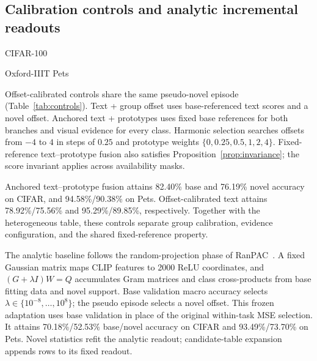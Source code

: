 \documentclass[research]{fcs}
\begin{document}
\subsection{Calibration controls and analytic incremental readouts}
\begin{table}[t]
\centering
\caption{Additional five-shot controls with the same frozen encoder, support images, and base-only calibration. Values are mean $\pm$ sample standard deviation across three partitions. The random-projection readout is a controlled frozen RanPAC-style adaptation described in the text.}
\label{tab:controls}
\small
\begin{minipage}{.49\textwidth}\centering CIFAR-100\\[3pt]\resizebox{\linewidth}{!}{}\end{minipage}\hfill
\begin{minipage}{.49\textwidth}\centering Oxford-IIIT Pets\\[3pt]\resizebox{\linewidth}{!}{}\end{minipage}
\end{table}

Offset-calibrated controls share the same pseudo-novel episode (Table~\ref{tab:controls}). Text + group offset uses base-referenced text scores and a novel offset. Anchored text + prototypes uses fixed base references for both branches and visual evidence for every class. Harmonic selection searches offsets from $-4$ to $4$ in steps of $0.25$ and prototype weights $\{0,0.25,0.5,1,2,4\}$. Fixed-reference text--prototype fusion also satisfies Proposition~\ref{prop:invariance}; the score invariant applies across availability masks.

Anchored text--prototype fusion attains 82.40\% base and 76.19\% novel accuracy on CIFAR, and 94.58\%/90.38\% on Pets. Offset-calibrated text attains 78.92\%/75.56\% and 95.29\%/89.85\%, respectively. Together with the heterogeneous table, these controls separate group calibration, evidence configuration, and the shared fixed-reference property.

The analytic baseline follows the random-projection phase of RanPAC~\cite{mcdonnell2023ranpac}. A fixed Gaussian matrix maps CLIP features to 2000 ReLU coordinates, and $(G+\lambda I)W=Q$ accumulates Gram matrices and class cross-products from base fitting data and novel support. Base validation macro accuracy selects $\lambda\in\{10^{-8},\ldots,10^8\}$; the pseudo episode selects a novel offset. This frozen adaptation uses base validation in place of the original within-task MSE selection. It attains 70.18\%/52.53\% base/novel accuracy on CIFAR and 93.49\%/73.70\% on Pets. Novel statistics refit the analytic readout; candidate-table expansion appends rows to its fixed readout.
\end{document}
